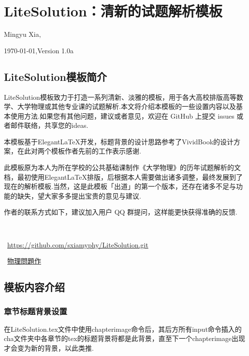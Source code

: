 \chapter{LiteSolution：清新的试题解析模板}
\centerline{Mingyu Xia, }

\centerline{\today,\quad Version 1.0a}
\section{LiteSolution模板简介}
{
\color{Periwinkle}LiteSolution模板致力于打造一系列清新、淡雅的模板，用于各大高校排版高等数学、大学物理或其他专业课的试题解析.本文将介绍本模板的一些设置内容以及基本使用方法.如果您有其他问题，建议或者意见，欢迎在 GitHub 上提交 issues 或者邮件联络，共享您的ideas.

本模板基于Elegant\LaTeX 开发，标题背景的设计思路参考了VividBook的设计方案，在此对两个模板作者先前的工作表示感谢.

此模板原为本人为所在学校的公共基础课制作《大学物理》的历年试题解析的文档，最初使用Elegant\LaTeX 排版，后根据本人需要做出诸多调整，最终发展到了现在的解析模板.当然，这是此模板「出道」的第一个版本，还存在诸多不足与功能的缺失，望大家多多提出宝贵的意见与建议.

作者的联系方式如下，建议加入用户 QQ 群提问，这样能更快获得准确的反馈.

\begin{multicols}{2}

    \faEnvelope\ 
    

    \faGithub\ \href{https://github.com/xiamyphys/LiteSolution.git}{https://github.com/sxiamyphy/LiteSolution.git}

    \ \href{http://weixin.qq.com/r/hR1SSofEIdpercMp90iX}{物理問題作}
\end{multicols}

\newpage
\section{模板内容介绍}
\subsection{章节标题背景设置}
在LiteSolution.tex文件中使用chapterimage命令后，其后方所有input命令插入的cha文件夹中各章节的tex的标题背景将都是此背景，直至下一个chapterimage出现才会变为新的背景，以此类推.

}
